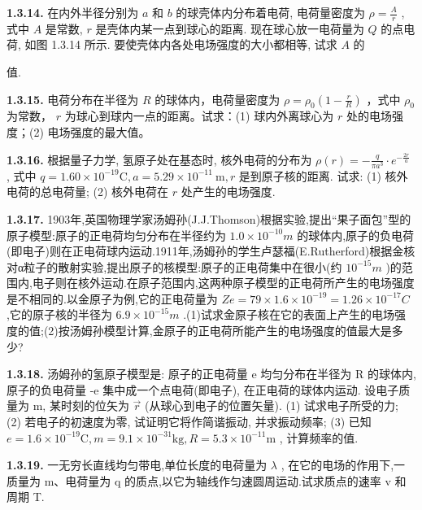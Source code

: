 \vfill

\newpage
\textbf{1.3.14.} 在内外半径分别为 $a$ 和 $b$ 的球壳体内分布着电荷, 电荷量密度为 $\displaystyle \rho = \frac{A}{r}$ , 式中 $A$ 是常数, $r$ 是壳体内某一点到球心的距离. 现在球心放一电荷量为 $Q$ 的点电荷, 如图 1.3.14 所示. 要使壳体内各处电场强度的大小都相等, 试求 $A$ 的

值.

\vfill

\textbf{1.3.15.} 电荷分布在半径为 $R$ 的球体内，电荷量密度为 $\displaystyle \rho = \rho_0\left(1 - \frac{r}{R}\right)$ ，式中 $\rho_0$ 为常数， $r$ 为球心到球内一点的距离。试求：(1) 球内外离球心为 $r$ 处的电场强度；(2) 电场强度的最大值。

\vfill

\newpage
\textbf{1.3.16.} 根据量子力学, 氢原子处在基态时, 核外电荷的分布为 $\displaystyle \rho(r) = -\frac{q}{\pi a^3} \cdot e^{-\frac{2r}{a}}$ , 式中 $q = 1.60 \times 10^{-19} \mathrm{C}, a = 5.29 \times 10^{-11} \mathrm{~m}, r$ 是到原子核的距离. 试求: (1) 核外电荷的总电荷量; (2) 核外电荷在 $r$ 处产生的电场强度.

\vfill

\textbf{1.3.17.} 1903年,英国物理学家汤姆孙(J.J.Thomson)根据实验,提出“果子面包”型的原子模型:原子的正电荷均匀分布在半径约为 $1.0\times10^{-10}m$ 的球体内,原子的负电荷(即电子)则在正电荷球内运动.1911年,汤姆孙的学生卢瑟福(E.Rutherford)根据金核对α粒子的散射实验,提出原子的核模型:原子的正电荷集中在很小(约 $10^{-15}m$ )的范围内,电子则在核外运动.在原子范围内,这两种原子模型的正电荷所产生的电场强度是不相同的.以金原子为例,它的正电荷量为 $Ze=79\times1.6\times10^{-19}=1.26\times10^{-17}C$ ,它的原子核的半径为 $6.9\times10^{-15}m$ .(1)试求金原子核在它的表面上产生的电场强度的值;(2)按汤姆孙模型计算,金原子的正电荷所能产生的电场强度的值最大是多少?

\vfill

\newpage
\textbf{1.3.18.} 汤姆孙的氢原子模型是: 原子的正电荷量 e 均匀分布在半径为 R 的球体内, 原子的负电荷量 -e 集中成一个点电荷(即电子), 在正电荷的球体内运动. 设电子质量为 m, 某时刻的位矢为 $\vec{r}$ (从球心到电子的位置矢量). (1) 试求电子所受的力; (2) 若电子的初速度为零, 试证明它将作简谐振动, 并求振动频率; (3) 已知 $e = 1.6 \times 10^{-19}\mathrm{C}, m = 9.1 \times 10^{-31}\mathrm{kg}, R = 5.3 \times 10^{-11}\mathrm{m}$ , 计算频率的值.

\vfill

\textbf{1.3.19.} 一无穷长直线均匀带电,单位长度的电荷量为 $\lambda$ , 在它的电场的作用下,一质量为 m、电荷量为 q 的质点,以它为轴线作匀速圆周运动.试求质点的速率 v 和周期 T.

